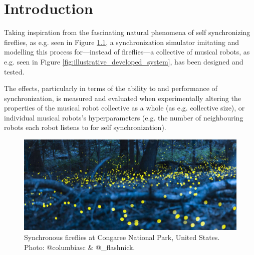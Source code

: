 \chapter{Introduction}
\label{chap:introduction}

Taking inspiration from the fascinating natural phenomena of self synchronizing fireflies, as e.g. seen in Figure \ref{fig:synched_fireflies_phenomenon}, a synchronization simulator imitating and modelling this process for—instead of fireflies—a collective of musical robots, as e.g. seen in Figure \ref{fig:illustrative_developed_system}, has been designed and tested.

The effects, particularly in terms of the ability to and performance of synchronization, is measured and evaluated when experimentally altering the properties of the musical robot collective as a whole (as e.g. collective size), or individual musical robots's hyperparameters (e.g. the number of neighbouring robots each robot listens to for self synchronization).

\begin{figure}[!ht]
	\centering
	\includegraphics[width=\linewidth]{Assets/DocSegments/Chapters/Background/Figures/Photos/synchronized_fireflies_phenomenon.jpg}
	\caption[Picture of fireflies flashing synchronously in a US National Park]{Synchronous fireflies at Congaree National Park, United States. Photo\protect\footnotemark: @columbiasc \& @\_flashnick.} %
	\label{fig:synched_fireflies_phenomenon}
\end{figure}


\np

